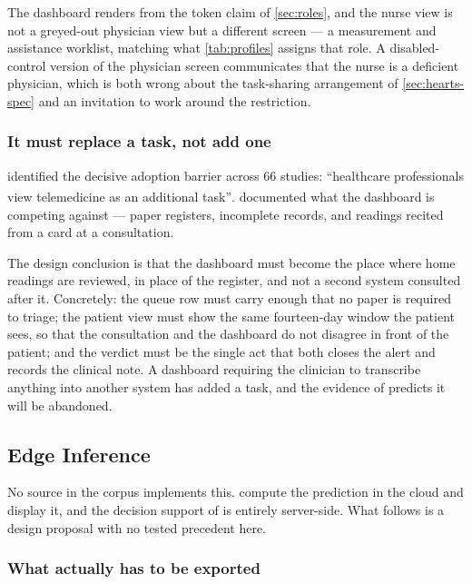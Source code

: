\documentclass[12pt,a4paper,oneside]{report}
\newcommand{\bq}[1]{``#1''\textsuperscript{\dag}}
\begin{document}
The dashboard renders from the token claim of \cref{sec:roles}, and the nurse view is not a greyed-out physician view but a different screen --- a measurement and assistance worklist, matching what \cref{tab:profiles} assigns that role. A disabled-control version of the physician screen communicates that the nurse is a deficient physician, which is both wrong about the task-sharing arrangement of \cref{sec:hearts-spec} and an invitation to work around the restriction.

\subsubsection{It must replace a task, not add one}\label{sec:replace-task}

\Textcite{dodoo2022} identified the decisive adoption barrier across 66 studies: \bq{healthcare professionals view telemedicine as an additional task}.  documented what the dashboard is competing against --- paper registers, incomplete records, and readings recited from a card at a consultation.

The design conclusion is that the dashboard must become the place where home readings are reviewed, in place of the register, and not a second system consulted after it. Concretely: the queue row must carry enough that no paper is required to triage; the patient view must show the same fourteen-day window the patient sees, so that the consultation and the dashboard do not disagree in front of the patient; and the verdict must be the single act that both closes the alert and records the clinical note. A dashboard requiring the clinician to transcribe anything into another system has added a task, and the evidence of \textcite{dodoo2022} predicts it will be abandoned.

\subsection{Edge Inference}\label{sec:edge-inference}

No source in the corpus implements this. \Textcite{efendi2025} compute the prediction in the cloud and display it, and the decision support of \textcite{yazdani2018} is entirely server-side. What follows is a design proposal with no tested precedent here.

\subsubsection{What actually has to be exported}\label{sec:export-what}
\end{document}
